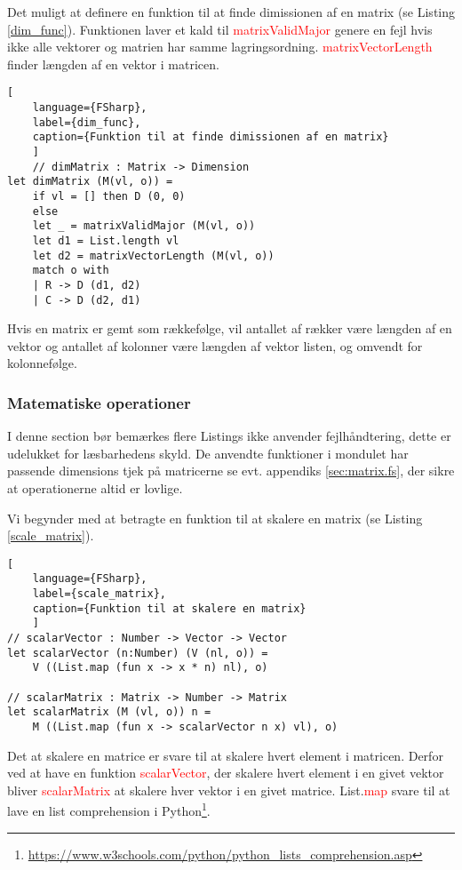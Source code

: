 Det muligt at definere en funktion til at finde dimissionen af en matrix (se Listing \ref{dim_func}). Funktionen laver et kald til \textcolor{red}{matrixValidMajor} genere en fejl hvis ikke alle vektorer og matrien har samme lagringsordning. \textcolor{red}{matrixVectorLength} finder længden af en vektor i matricen.

\begin{lstlisting}[
    language={FSharp}, 
    label={dim_func}, 
    caption={Funktion til at finde dimissionen af en matrix}
    ]
    // dimMatrix : Matrix -> Dimension
let dimMatrix (M(vl, o)) =
    if vl = [] then D (0, 0)
    else
    let _ = matrixValidMajor (M(vl, o))
    let d1 = List.length vl
    let d2 = matrixVectorLength (M(vl, o))
    match o with
    | R -> D (d1, d2)
    | C -> D (d2, d1)
\end{lstlisting}

Hvis en matrix er gemt som rækkefølge, vil antallet af rækker være længden af en vektor og antallet af kolonner være længden af vektor listen, og omvendt for kolonnefølge.

\subsubsection{Matematiske operationer}
I denne section bør bemærkes flere Listings ikke anvender fejlhåndtering, dette er udelukket for læsbarhedens skyld. De anvendte funktioner i mondulet har passende dimensions tjek på matricerne se evt. appendiks \ref{sec:matrix.fs}, der sikre at operationerne altid er lovlige.

Vi begynder med at betragte en funktion til at skalere en matrix (se Listing \ref{scale_matrix}). 

\begin{lstlisting}[
    language={FSharp}, 
    label={scale_matrix}, 
    caption={Funktion til at skalere en matrix}
    ]
// scalarVector : Number -> Vector -> Vector
let scalarVector (n:Number) (V (nl, o)) = 
    V ((List.map (fun x -> x * n) nl), o)

// scalarMatrix : Matrix -> Number -> Matrix
let scalarMatrix (M (vl, o)) n = 
    M ((List.map (fun x -> scalarVector n x) vl), o)
\end{lstlisting}

Det at skalere en matrice er svare til at skalere hvert element i matricen. Derfor ved at have en funktion \textcolor{red}{scalarVector}, der skalere hvert element i en givet vektor bliver \textcolor{red}{scalarMatrix} at skalere hver vektor i en givet matrice. List.\textcolor{red}{map} svare til at lave en list comprehension i Python\footnote{\url{https://www.w3schools.com/python/python_lists_comprehension.asp}}.


